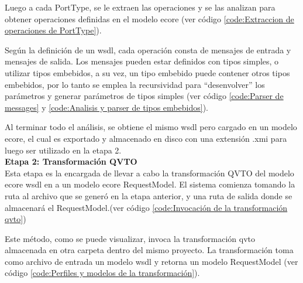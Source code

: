 Luego a cada PortType, se le extraen las operaciones y se las analizan para obtener operaciones definidas en el modelo ecore (ver código \ref{code:Extraccion de operaciones de PortType}).



Según la definición de un wsdl, cada operación consta de mensajes de entrada y mensajes de salida. Los mensajes pueden estar definidos con tipos simples, o utilizar tipos embebidos, a su vez, un tipo embebido puede contener otros tipos embebidos, por lo tanto se emplea la recursividad para “desenvolver” los parámetros y generar parámetros de tipos simples (ver código \ref{code:Parser de messages} y \ref{code:Analisis y parser de tipos embebidos}).





Al terminar todo el análisis, se obtiene el mismo wsdl pero cargado en un modelo ecore, el cual es exportado y almacenado en disco con una extensión .xmi para luego ser utilizado en la etapa 2.\\

\textbf{Etapa 2: Transformación QVTO}\\

Esta etapa es la encargada de llevar a cabo la transformación QVTO del modelo ecore wsdl en a un modelo ecore RequestModel. El sistema comienza tomando la ruta al archivo que se generó en la etapa anterior, y una ruta de salida donde se almacenará el RequestModel.(ver código \ref{code:Invocación de la transformación qvto})



Este método, como se puede visualizar, invoca la transformación qvto almacenada en otra carpeta dentro del mismo proyecto. La transformación toma como archivo de entrada un modelo wsdl y retorna un modelo RequestModel (ver código \ref{code:Perfiles y modelos de la transformación}).


